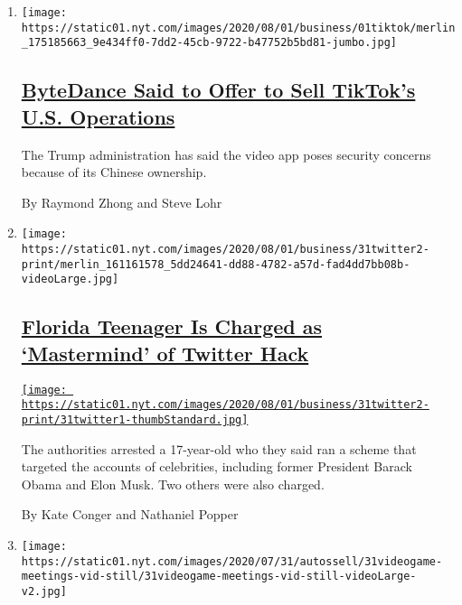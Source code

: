 \begin{enumerate}
\def\labelenumi{\arabic{enumi}.}
\item
  \texttt{[image: https://static01.nyt.com/images/2020/08/01/business/01tiktok/merlin\_175185663\_9e434ff0-7dd2-45cb-9722-b47752b5bd81-jumbo.jpg]}

  \hypertarget{bytedance-said-to-offer-to-sell-tiktoks-us-operations}{%
  \subsection{\texorpdfstring{\href{/2020/08/01/technology/tiktok-sale-trump-ban.html}{ByteDance
  Said to Offer to Sell TikTok's U.S.
  Operations}}{ByteDance Said to Offer to Sell TikTok's U.S. Operations}}\label{bytedance-said-to-offer-to-sell-tiktoks-us-operations}}

  The Trump administration has said the video app poses security
  concerns because of its Chinese ownership.

  By Raymond Zhong and Steve Lohr
\item
  \texttt{[image: https://static01.nyt.com/images/2020/08/01/business/31twitter2-print/merlin\_161161578\_5dd24641-dd88-4782-a57d-fad4dd7bb08b-videoLarge.jpg]}

  \hypertarget{florida-teenager-is-charged-as-mastermind-of-twitter-hack}{%
  \subsection{\texorpdfstring{\href{/2020/07/31/technology/twitter-hack-arrest.html}{Florida
  Teenager Is Charged as `Mastermind' of Twitter
  Hack}}{Florida Teenager Is Charged as `Mastermind' of Twitter Hack}}\label{florida-teenager-is-charged-as-mastermind-of-twitter-hack}}

  \href{/2020/07/31/technology/twitter-hack-arrest.html}{\texttt{[image: https://static01.nyt.com/images/2020/08/01/business/31twitter2-print/31twitter1-thumbStandard.jpg]}}

  The authorities arrested a 17-year-old who they said ran a scheme that
  targeted the accounts of celebrities, including former President
  Barack Obama and Elon Musk. Two others were also charged.

  By Kate Conger and Nathaniel Popper
\item
  \texttt{[image: https://static01.nyt.com/images/2020/07/31/autossell/31videogame-meetings-vid-still/31videogame-meetings-vid-still-videoLarge-v2.jpg]}

  \hypertarget{hey-you-free-on-friday-for-a-meeting-and-a-bank-heist}{%
}
\end{enumerate}
